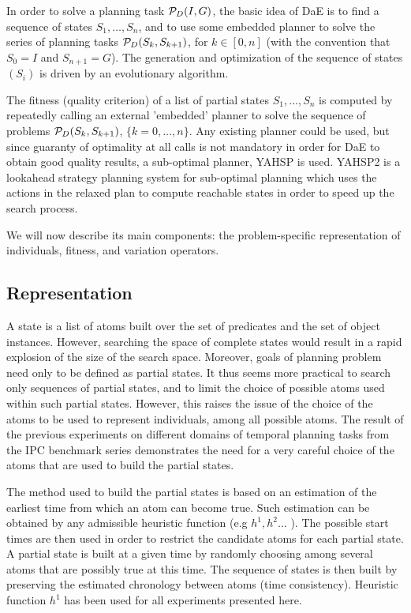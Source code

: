 \documentclass{acm_proc_article-sp}
\begin{document}
In order to solve a planning task ${\cal P}_D(I,G)$, the basic idea of DaE is to find a sequence of states $S_1, \ldots, S_n$, and to use some embedded planner to solve the series of planning tasks ${\cal P}_D(S_{k},S_{k+1})$, for $k \in [0,n]$ (with the convention that $S_0 = I$ and $S_{n+1} = G$). The generation and optimization of the sequence of states $(S_i)$ is driven by an evolutionary algorithm. 

The fitness (quality criterion) of a list of partial states $S_1, \ldots, S_n$ is computed by repeatedly calling an external 'embedded' planner to solve the sequence of problems ${\cal P}_D(S_{k},S_{k+1})$, $\{k=0,\ldots,n\}$. Any existing planner could be used, but since guaranty of optimality at all calls is not mandatory in order for DaE to obtain good quality results, a sub-optimal planner, YAHSP is used. YAHSP2 \cite{V:icaps04} is a lookahead strategy planning system for sub-optimal planning which uses the  actions in the relaxed plan to compute reachable states in order to speed up the search process. 

We will now describe its main components: the problem-specific representation of individuals, fitness, and variation operators.

\subsection{Representation}
\label{section:representation}
A state is a list of atoms built over the set of predicates and the set of object instances. However, searching the space of complete states would result in a rapid explosion of the size of the search space. Moreover, goals of planning problem need only to be defined as partial states. It thus seems more practical to search only sequences of partial states, and to limit the choice of possible atoms used within such partial states. However, this raises the issue of the choice of the atoms to be used to represent individuals, among all possible atoms. The result of the previous experiments on different domains of temporal planning tasks from the IPC benchmark series \cite{BibEvoCop2009} demonstrates the need for a very careful choice of the atoms that are used to build the partial states. 

The method used to build the partial states is based on an estimation of the earliest time from which an atom can become true. Such estimation can be obtained by any admissible heuristic function (e.g $h^1,h^2...$ \cite{HaslumGeffner-AIPS-2000}). The possible start times are then used in order to restrict the candidate atoms for each partial state. A partial state is built at a given time by randomly choosing among several atoms that are possibly true at this time. The sequence of states is then built by preserving the estimated chronology between atoms (time consistency). Heuristic function $h^1$ has been used for all experiments presented here.
\end{document}
